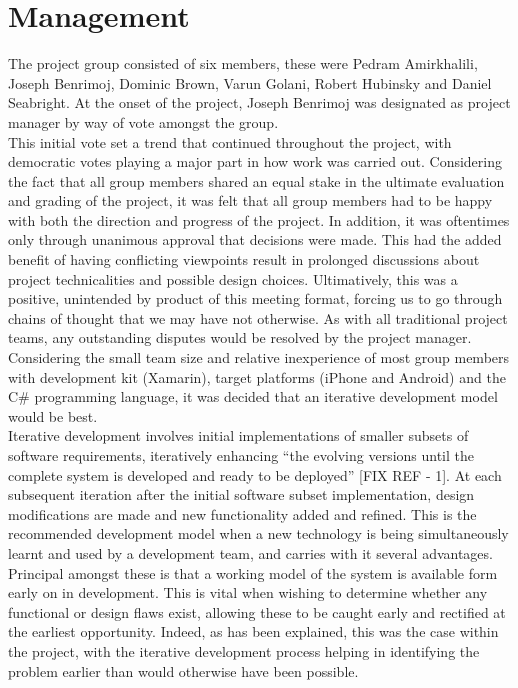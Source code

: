 \documentclass[main.tex]{subfiles}
\begin{document}
\chapter{Management}

The project group consisted of six members, these were Pedram Amirkhalili, Joseph Benrimoj, Dominic Brown, Varun Golani, Robert Hubinsky and Daniel Seabright. At the onset of the project, Joseph Benrimoj was designated as project manager by way of vote amongst the group.\\

This initial vote set a trend that continued throughout the project, with democratic votes playing a major part in how work was carried out. Considering the fact that all group members shared an equal stake in the ultimate evaluation and grading of the project, it was felt that all group members had to be happy with both the direction and progress of the project. In addition, it was oftentimes only through unanimous approval that decisions were made. This had the added benefit of having conflicting viewpoints result in prolonged discussions about project technicalities and possible design choices. Ultimatively, this was a positive, unintended by product of this meeting format, forcing us to go through chains of thought that we may have not otherwise. As with all traditional project teams, any outstanding disputes would be resolved by the project manager. \\

Considering the small team size and relative inexperience of most group members with development kit (Xamarin), target platforms (iPhone and Android) and the C\# programming language, it was decided that an iterative development model would be best.  \\

Iterative development involves initial implementations of smaller subsets of software requirements, iteratively enhancing ``the evolving versions until the complete system is developed and ready to be deployed'' [FIX REF - 1]. At each subsequent iteration after the initial software subset implementation, design modifications are made and new functionality added and refined. This is the recommended development model when a new technology is being simultaneously learnt and used by a development team, and carries with it several advantages.\\

Principal amongst these is that a working model of the system is available form early on in development. This is vital when wishing to determine whether any functional or design flaws exist, allowing these to be caught early and rectified at the earliest opportunity. Indeed, as has been explained, this was the case within the project, with the iterative development process helping in identifying the problem earlier than would otherwise have been possible.\\
\end{document}
